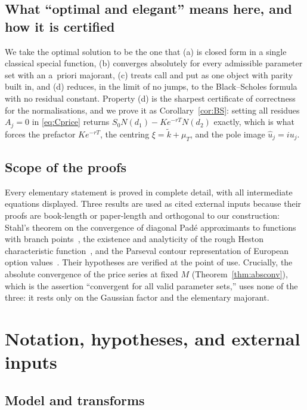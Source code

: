 \documentclass[11pt]{article}
\begin{document}
\subsection{What ``optimal and elegant'' means here, and how it is certified}

We take the optimal solution to be the one that (a) is closed form in a
single classical special function, (b) converges absolutely for every
admissible parameter set with an a~priori majorant, (c) treats call and put
as one object with parity built in, and (d) reduces, in the limit of no
jumps, to the Black--Scholes formula with no residual constant. Property (d)
is the sharpest certificate of correctness for the normalisations, and we
prove it as Corollary~\ref{cor:BS}: setting all residues $A_j=0$ in
\eqref{eq:Cprice} returns $S_0N(d_1)-Ke^{-rT}N(d_2)$ exactly, which is what
forces the prefactor $Ke^{-rT}$, the centring $\xi=\tilde k+\mu_T$, and the
pole image $\hat u_j=iu_j$.

\subsection{Scope of the proofs}

Every elementary statement is proved in complete detail, with all
intermediate equations displayed. Three results are used as cited external
inputs because their proofs are book-length or paper-length and orthogonal
to our construction: Stahl's theorem on the convergence of diagonal Pad\'e
approximants to functions with branch points~\cite{Stahl}, the existence
and analyticity of the rough Heston characteristic
function~\cite{ElEuchRosenbaum}, and the Parseval contour
representation of European option values~\cite{Widder}. Their
hypotheses are verified at the point of use. Crucially, the absolute
convergence of the price series at fixed $M$ (Theorem~\ref{thm:absconv}),
which is the assertion ``convergent for all valid parameter sets,'' uses
none of the three: it rests only on the Gaussian factor and the elementary
majorant.

\section{Notation, hypotheses, and external inputs}\label{sec:standing}

\subsection{Model and transforms}
\end{document}

